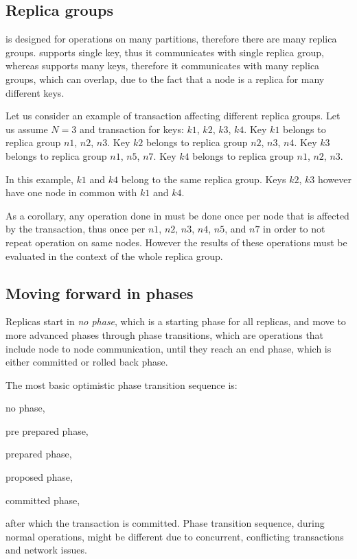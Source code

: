\subsection{Replica groups}
\label{sec:mpp:replicaGroups}
\mpp is designed for operations on many partitions, therefore there are many replica groups. \lwt supports single key, thus it communicates with single replica group, whereas \mpp supports many keys, therefore it communicates with many replica groups, which can overlap, due to the fact that a node is a replica for many different keys. 

Let us consider an example of transaction affecting different replica groups. Let us assume $N=3$ and transaction for keys: $k1$, $k2$, $k3$, $k4$.
Key $k1$ belongs to replica group $n1$, $n2$, $n3$.
Key $k2$ belongs to replica group $n2$, $n3$, $n4$.
Key $k3$ belongs to replica group $n1$, $n5$, $n7$.
Key $k4$ belongs to replica group $n1$, $n2$, $n3$.

In this example, $k1$ and $k4$ belong to the same replica group. Keys $k2$, $k3$ however have one node in common with $k1$ and $k4$.

As a corollary, any operation done in \mpp must be done once per node that is affected by the transaction, thus once per $n1$, $n2$, $n3$, $n4$, $n5$, and $n7$ in order to not repeat operation on same nodes. However the results of these operations must be evaluated in the context of the whole replica group. 


\subsection{Moving forward in phases}
Replicas start in \emph{no phase}, which is a starting phase for all replicas, and move to more advanced phases through phase transitions, which are operations that include node to node communication, until they reach an end phase, which is either committed or rolled back phase.

The most basic optimistic phase transition sequence is: \begin{enumerate*} \item no phase, \item pre prepared phase, \item prepared phase, \item proposed phase, \item committed phase, \end{enumerate*} after which the transaction is committed. Phase transition sequence, during normal operations, might be different due to concurrent, conflicting transactions and network issues.


